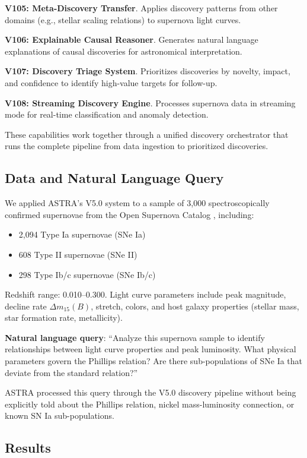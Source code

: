 \documentclass[usenatbib]{rasti}
\begin{document}
\noindent\textbf{V105: Meta-Discovery Transfer}. Applies discovery patterns from other domains (e.g., stellar scaling relations) to supernova light curves.

\noindent\textbf{V106: Explainable Causal Reasoner}. Generates natural language explanations of causal discoveries for astronomical interpretation.

\noindent\textbf{V107: Discovery Triage System}. Prioritizes discoveries by novelty, impact, and confidence to identify high-value targets for follow-up.

\noindent\textbf{V108: Streaming Discovery Engine}. Processes supernova data in streaming mode for real-time classification and anomaly detection.

These capabilities work together through a unified discovery orchestrator that runs the complete pipeline from data ingestion to prioritized discoveries.

\subsection{Data and Natural Language Query}

We applied ASTRA's V5.0 system to a sample of 3,000 spectroscopically confirmed supernovae from the Open Supernova Catalog \cite{guillochon2017}, including:
\begin{itemize}
\item 2,094 Type Ia supernovae (SNe Ia)
\item 608 Type II supernovae (SNe II)
\item 298 Type Ib/c supernovae (SNe Ib/c)
\end{itemize}
Redshift range: 0.010--0.300. Light curve parameters include peak magnitude, decline rate $\Delta m_{15}(B)$, stretch, colors, and host galaxy properties (stellar mass, star formation rate, metallicity).

\textbf{Natural language query}: ``Analyze this supernova sample to identify relationships between light curve properties and peak luminosity. What physical parameters govern the Phillips relation? Are there sub-populations of SNe Ia that deviate from the standard relation?''

ASTRA processed this query through the V5.0 discovery pipeline without being explicitly told about the Phillips relation, nickel mass-luminosity connection, or known SN Ia sub-populations.

\subsection{Results}
\end{document}
